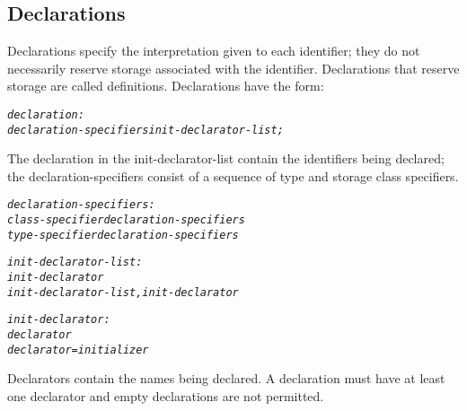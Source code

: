 \documentclass[12pt]{report}
\begin{document}
\subsection{Declarations}
\begin{doublespace}
Declarations specify the interpretation given to each identifier; they do not necessarily reserve storage associated with the identifier. Declarations that reserve storage are called definitions. Declarations have the form:
\begin{singlespace}
\begin{alltt}
         \textit{declaration:}
              \textit{declaration-specifiers init-declarator-list;}
\end{alltt}
\end{singlespace}
The declaration in the init-declarator-list contain the identifiers being declared; the declaration-specifiers consist of a sequence of type and storage class specifiers.
\begin{singlespace}
\begin{alltt}
         \textit{declaration-specifiers:}
              \textit{class-specifier declaration-specifiers}
              \textit{type-specifier declaration-specifiers}
              
         \textit{init-declarator-list:}
              \textit{init-declarator}
              \textit{init-declarator-list , init-declarator}
              
         \textit{init-declarator:}
              \textit{declarator}
              \textit{declarator = initializer}
\end{alltt}
\end{singlespace}
Declarators contain the names being declared. A declaration must have at least one declarator and empty declarations are not permitted.
\end{doublespace}
\end{document}

